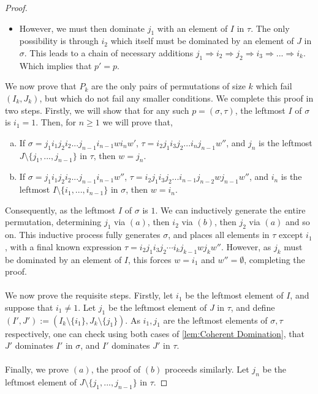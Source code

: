 \documentclass{amsart}
\theoremstyle{definition}
\renewcommand{\implies}{\Rightarrow} %
\begin{document}
\begin{proof}
\begin{itemize}
    \item However, we must then dominate $j_1$ with an element of $I$ in $\tau$. 
    The only possibility is through $i_2$ which itself must be dominated by an element of $J$ in $\sigma$.
    This leads to a chain of necessary additions $j_1 \implies i_2\implies j_2 \implies i_3 \implies ... \implies i_{k}$. 
    Which implies that $p'=p$.
\end{itemize}
We now prove that $P_k$ are the only pairs of permutations of size $k$ which fail $(I_k,J_k)$, but which do not fail any smaller conditions. 
We complete this proof in two steps.
Firstly, we will show that for any such $p=(\sigma,\tau)$, the leftmost $I$ of $\sigma$ is $i_1=1$.
Then, for $n\geq1$ we will prove that,
\begin{enumerate}[(a)]
    \item If $\sigma = j_1 i_1 j_2 i_2 ... j_{n-1} i_{n-1} w i_{n} w'$, $\tau = i_2 j_1 i_3 j_2 ... i_{n}j_{n-1}w''$, and $j_n$ is the leftmost $J\setminus \{j_1,...,j_{n-1}\}$ in $\tau$, then $w = j_n$.
    \item If $\sigma = j_1 i_1 j_2 i_2 ... j_{n-1} i_{n-1} w''$, $\tau = i_2 j_1 i_3 j_2 ... i_{n-1}j_{n-2} w j_{n-1} w''$, and $i_n$ is the leftmost $I\setminus \{i_1,...,i_{n-1}\}$ in $\sigma$, then $w = i_n$.
\end{enumerate}
Consequently, as the leftmost $I$ of $\sigma$ is $1$.
We can inductively generate the entire permutation, determining $j_1$ via $(a)$, then $i_2$ via $(b)$, then $j_2$ via $(a)$ and so on.
This inductive process fully generates $\sigma$, and places all elements in $\tau$ except $i_1$, with a final known expression  $\tau = i_2 j_1 i_3 j_2 \cdots i_k j_{k-1} w j_k w''$.
However, as $j_k$ must be dominated by an element of $I$, this forces $w = i_1$ and $w'' =\emptyset$, completing the proof.
\\\\
We now prove the requisite steps.
Firstly, let $i_1$ be the leftmost element of $I$, and suppose that $i_1\neq 1$. 
Let $j_1$ be the leftmost element of $J$ in $\tau$, and define $(I',J'):=(I_k\setminus \{i_1\}, J_k \setminus \{j_1\})$.
As $i_1, j_1$ are the leftmost elements of $\sigma,\tau$ respectively, one can check using both cases of \cref{lem:Coherent Domination}, that $J'$ dominates $I'$ in $\sigma$, and $I'$ dominates $J'$ in $\tau$.
\\\\
Finally, we prove $(a)$, the proof of $(b)$ proceeds similarly. 
Let $j_n$ be the leftmost element of $J\setminus \{j_1,...,j_{n-1} \}$ in $\tau$.

\end{proof}
\end{document}

